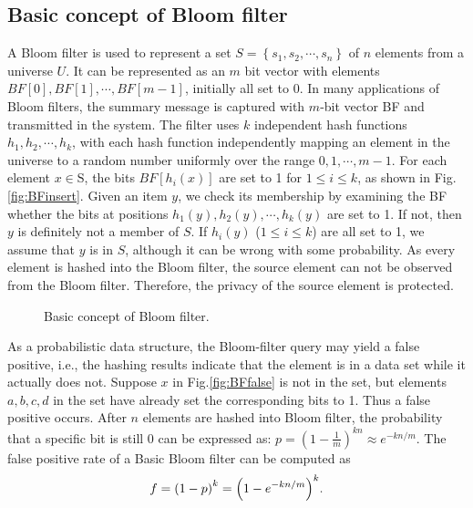 \documentclass[10pt,journal,letterpaper]{IEEEtran}
\newcommand{\rev}[1]{#1}
\begin{document}
\subsection{Basic concept of Bloom filter}
\label{subsec:Basic concept of Bloom filter}
A Bloom filter is used to represent a set $S = \left\{ {{s_1},{s_2}, \cdots ,{s_n}} \right\}$ of $n$ elements from a universe $U$. It can be represented as an $m$ bit vector with elements $BF[0],BF[1], \cdots ,BF\left[ {m - 1} \right]$, initially all set to 0.
In many applications of Bloom filters, the summary message is captured with $m$-bit vector BF and transmitted in the system.
The filter uses $k$ independent hash functions $h_1,h_2, \cdots ,h_k$, with each hash function independently mapping an element in the universe to a random number uniformly over the range ${0,1, \cdots ,m-1}$. For each element ${x} \in {\text{S}}$, the bits $BF[h_i(x)]$ are set to 1 for $1 \le i \le k$, as shown in Fig.\ref{fig:BFinsert}. Given an item $y$, we check its membership by examining the BF whether the bits at positions $h_1(y),h_2(y), \cdots ,h_k(y)$ are set to 1.  If not, then $y$ is definitely not a member of $S$.  If $h_i(y)$ ($1 \le i \le k$) are all set to 1, we assume that $y$ is in $S$, although it can be wrong with some probability. %
As every element is hashed into the Bloom filter, the source element can not be observed from the Bloom filter. Therefore, the privacy of the source element is protected.
\begin{figure}[!h]
\centering
{}
\caption{Basic concept of Bloom filter.}
\label{fig:Operations on basic bloom filter}
\end{figure}

As a probabilistic data structure, the Bloom-filter query may yield a false positive, i.e., the hashing results indicate that the element is in a data set while it actually does not. Suppose $x$ in Fig.\ref{fig:BFfalse} is not in the set, but elements $a, b, c, d$ in the set have already set the corresponding bits to 1. Thus a false positive occurs. After $n$ elements are hashed into Bloom filter, the probability that a specific bit is still 0 can be expressed as: $p = {\left( {1 - \frac{1}{m}} \right)^{kn}} \approx {e^{ - kn/m}}$. The false positive rate of a Basic Bloom filter can be computed as
\begin{equation}
\footnotesize
f = {\left( {1 - p} \right)^k} = {\left( {1 - {e^{ - kn/m}}} \right)^k}.
\label{eq:false positive}
\end{equation}
\end{document}
